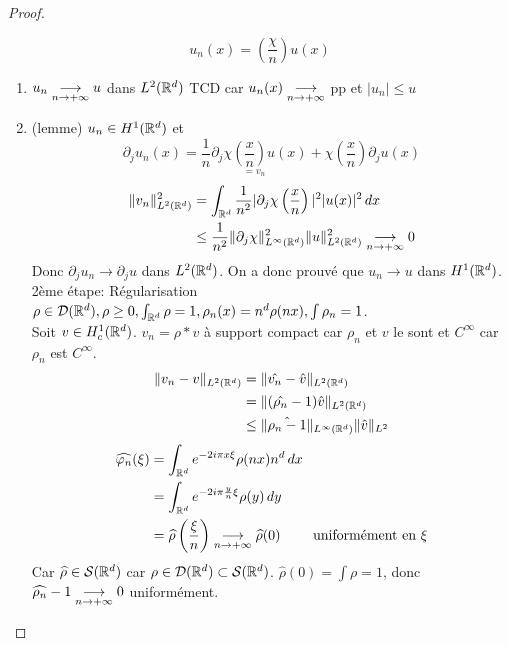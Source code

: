 \documentclass[]{report}
\begin{document}
\begin{proof}
\begin{center}
\begin{tikzpicture}[scale=1.2]
\end{tikzpicture}
        \end{center}
        \[u_n(x)=\left(\frac{\chi}{n}\right)u(x)\]
        \begin{enumerate}
            \item $u_n\underset{n\to +\infty}{\longrightarrow} u$ dans $L^2(\mathbb{R}^d)$ TCD car $u_n(x)\underset{n\to +\infty}{\longrightarrow}$ pp et $|u_n|\le u$
            \item (lemme) $u_n\in H^1(\mathbb{R}^d)$ et
            \[\partial_j u_n(x)=\underset{=v_n}{\frac{1}{n}\partial_j \chi\left(\frac{x}{n}\right)u(x)}+\chi\left(\frac{x}{n}\right)\partial_j u(x)\]
            \begin{align*}
                \lVert v_n \rVert^2_{L^2(\mathbb{R}^d)}&=\int_{\mathbb{R}^d} \frac{1}{n^2}|\partial_j \chi\left(\frac{x}{n}\right)|^2 |u(x)|^2\, dx\\
                &\le \frac{1}{n^2}\lVert \partial_j \chi \rVert^2_{L^\infty(\mathbb{R}^d)}\lVert u \rVert^2_{L^2(\mathbb{R}^d)}\underset{n\to +\infty}{\longrightarrow} 0
            \end{align*}
            Donc $\partial_j u_n\to \partial_j u$ dans $L^2(\mathbb{R}^d)$. On a donc prouvé que $u_n\to u$ dans $H^1(\mathbb{R}^d)$.\\
            2ème étape: Régularisation\\
            $\rho\in\mathcal{D}(\mathbb{R}^d),\rho\ge 0,\int_{\mathbb{R}^d}\rho=1,\rho_n(x)=n^d\rho(nx),\int\rho_n=1$.\\
            Soit $v\in H^1_c(\mathbb{R}^d)$. $v_n=\rho*v$ à support compact car $\rho_n$ et $v$ le sont et $C^\infty$ car $\rho_n$ est $C^\infty$.
            \begin{align*}
                \lVert v_n-v \rVert_{L^2(\mathbb{R}^d)}&=\lVert \hat{v_n}-\hat{v} \rVert_{L^2(\mathbb{R}^d)}\\
                &=\lVert (\hat{\rho_n}-1)\hat{v} \rVert_{ L^2(\mathbb{R}^d)}\\
                &\le \lVert \hat{\rho_n-1} \rVert_{L^\infty(\mathbb{R}^d)} \lVert \hat{v} \rVert_{L^2}
            \end{align*}
            \begin{align*}
                \widehat{\varphi_n}(\xi)&=\int_{\mathbb{R}^d} e^{-2 i\pi x\xi}\rho(nx)n^d\, dx\\
                &=\int_{\mathbb{R}^d}e^{-2i\pi \frac{y}{n}\xi}\rho(y)\, dy\\
                &=\widehat{\rho}\left(\frac{\xi}{n}\right)\underset{n\to +\infty}{\longrightarrow} \widehat{\rho}(0)\qquad \text{ uniformément en $\xi$}
            \end{align*}
            Car $\widehat{\rho}\in \mathcal{S}(\mathbb{R}^d)$ car $\rho\in \mathcal{D}(\mathbb{R}^d)\subset \mathcal{S}(\mathbb{R}^d)$. $\widehat{\rho}(0)=\int \rho=1$, donc $\widehat{\rho_n}-1\underset{n\to +\infty}{\longrightarrow} 0$ uniformément.

\end{enumerate}
\end{proof}
\end{document}
